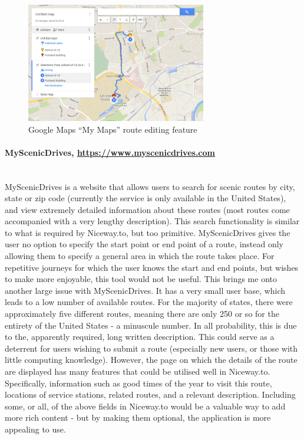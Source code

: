 \begin{figure}[!ht]
\begin{center}
\includegraphics[width=0.7\textwidth]{images/google_maps.png}
\end{center}
\vspace{-6mm}
\caption{Google Maps ``My Maps'' route editing feature}
\vspace{-6mm}
\end{figure}

\paragraph{MyScenicDrives, \url{https://www.myscenicdrives.com}}\ \\
MyScenicDrives is a website that allows users to search for scenic routes by city, state or zip code (currently the service is only available in the United States), and view extremely detailed information about these routes (most routes come accompanied with a very lengthy description). This search functionality is similar to what is required by Niceway.to, but too primitive. MyScenicDrives gives the user no option to specify the start point or end point of a route, instead only allowing them to specify a general area in which the route takes place. For repetitive journeys for which the user knows the start and end points, but wishes to make more enjoyable, this tool would not be useful. This brings me onto another large issue with MyScenicDrives. It has a very small user base, which leads to a low number of available routes. For the majority of states, there were approximately five different routes, meaning there are only 250 or so for the entirety of the United States - a minuscule number. In all probability, this is due to the, apparently required, long written description. This could serve as a deterrent for users wishing to submit a route (especially new users, or those with little computing knowledge). However, the page on which the details of the route are displayed has many features that could be utilised well in Niceway.to. Specifically, information such as good times of the year to visit this route, locations of service stations, related routes, and a relevant description. Including some, or all, of the above fields in Niceway.to would be a valuable way to add more rich content - but by making them optional, the application is more appealing to use. 

